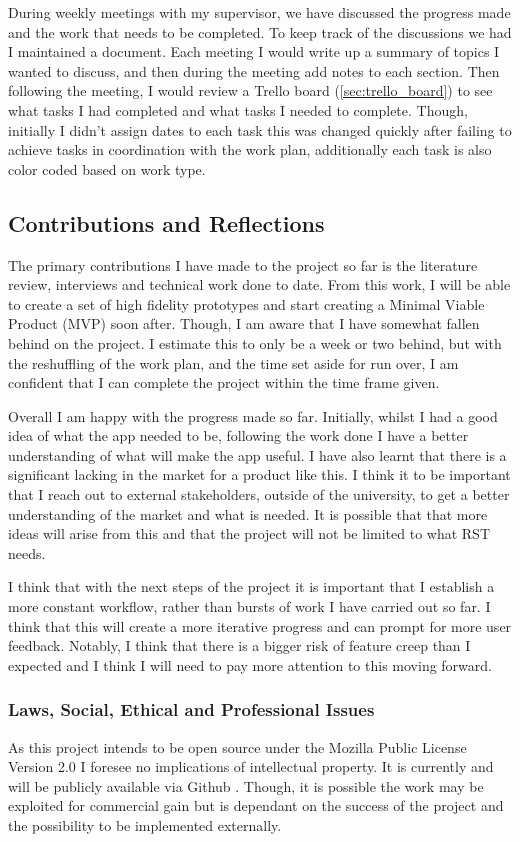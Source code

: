 \documentclass [11pt,a4paper]{article}
\begin{document}
During weekly meetings with my supervisor, we have discussed the progress made and the work that needs to be completed. To keep track of the discussions we had I maintained a document. Each meeting I would write up a summary of topics I wanted to discuss, and then during the meeting add notes to each section. Then following the meeting, I would review a Trello board (\ref{sec:trello_board}) to see what tasks I had completed and what tasks I needed to complete. Though, initially I didn't assign dates to each task this was changed quickly after failing to achieve tasks in coordination with the work plan, additionally each task is also color coded  based on work type. 

\subsection{Contributions and Reflections}
\label{sec:contributions}
The primary contributions I have made to the project so far is the literature review, interviews and technical work done to date. From this work, I will be able to create a set of high fidelity prototypes and start creating a Minimal Viable Product (MVP) soon after. Though, I am aware that I have somewhat fallen behind on the project. I estimate this to only be a week or two behind, but with the reshuffling of the work plan, and the time set aside for run over, I am confident that I can complete the project within the time frame given.

Overall I am happy with the progress made so far. Initially, whilst I had a good idea of what the app needed to be, following the work done I have a better understanding of what will make the app useful. I have also learnt that there is a significant lacking in the market for a product like this.  I think it to be important that I reach out to external stakeholders, outside of the university, to get a better understanding of the market and what is needed. It is possible that that more ideas will arise from this and that the project will not be limited to what RST needs. 

I think that with the next steps of the project it is important that I establish a more constant workflow, rather than bursts of work I have carried out so far. I think that this will create a more iterative progress and can prompt for more user feedback. Notably, I think that there is a bigger risk of feature creep than I expected and I think I will need to pay more attention to this moving forward.

\subsubsection{Laws, Social, Ethical and Professional Issues}
\label{sec:computer_laws}
As this project intends to be open source under the Mozilla Public License Version 2.0 I foresee no implications of intellectual property. It is currently and will be publicly available via Github \cite{keeptrackgithub}. Though, it is possible the work may be exploited for commercial gain but is dependant on the success of the project and the possibility to be implemented externally.
\end{document}
